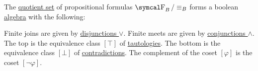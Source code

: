 \begin{theorem}\label{thm:propositional_logic_boolean_algebra}
  The \hyperref[def:equivalence_relation]{quotient set} of propositional formulas \( \CF_B / \equiv_B \) forms a boolean \hyperref[def:boolean_algebra]{algebra} with the following:
  \begin{RefList}
     Finite joins are given by \hyperref[def:propositional_alphabet/connectives/disjunction]{disjunctions \( \vee \)}.
     Finite meets are given by \hyperref[def:propositional_alphabet/connectives/conjunction]{conjunctions \( \wedge \)}.
     The top is the equivalence class \( [\top] \) of \hyperref[def:propositional_interpretation/tautology]{tautologies}.
     The bottom is the equivalence class \( [\bot] \) of \hyperref[def:propositional_interpretation/contradiction]{contradictions}.
     The complement of the coset \( [\varphi] \) is the coset \hyperref[def:propositional_alphabet/negation]{\( [\neg \varphi] \)}.
  \end{RefList}
\end{theorem}
